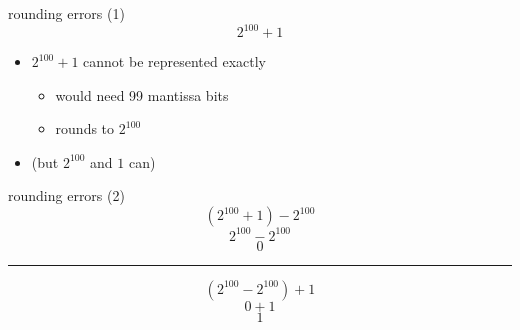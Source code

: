 
\begin{frame}{rounding errors (1)}
\[
2^{100} + 1
\]
\begin{itemize}
\item $2^{100}+1$ cannot be represented exactly
    \begin{itemize}
    \item would need 99 mantissa bits
    \item rounds to $2^{100}$
    \end{itemize}
\item (but $2^{100}$ and $1$ can)
\end{itemize}
\end{frame}

\begin{frame}{rounding errors (2)}
\[
(2^{100} + 1) - 2^{100} 
\]
\[
2^{100} - 2^{100}
\]
\[
0
\]
\vspace{.25cm}
\hrule
\vspace{.25cm}
\[
(2^{100} - 2^{100}) + 1
\]
\[
0 + 1
\]
\[
1
\]
\end{frame}
